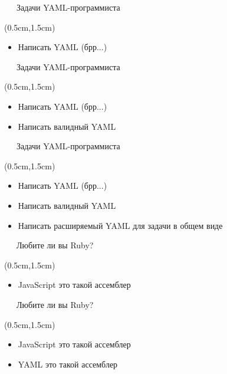\documentclass[xetex,18pt,aspectratio=43]{beamer}
\begin{document}
\begin{Large}
\begin{frame}{\ \ \ Задачи YAML-программиста}
\begin{textblock*}{\framewidth-0.8cm}(0.5cm,1.5cm)
\begin{itemize}
  \item Написать YAML (брр...)
\end{itemize}
\end{textblock*}
\end{frame}

\begin{frame}{\ \ \ Задачи YAML-программиста}
\begin{textblock*}{\framewidth-0.8cm}(0.5cm,1.5cm)
\begin{itemize}
  \item Написать YAML (брр...)
  \item Написать валидный YAML
\end{itemize}
\end{textblock*}
\end{frame}

\begin{frame}{\ \ \ Задачи YAML-программиста}
\begin{textblock*}{\framewidth-0.8cm}(0.5cm,1.5cm)
\begin{itemize}
  \item Написать YAML (брр...)
  \item Написать валидный YAML
  \item Написать расширяемый YAML для задачи в общем виде
\end{itemize}
\end{textblock*}
\end{frame}

\begin{frame}{\ \ \ Любите ли вы Ruby?}
\begin{textblock*}{\framewidth-0.8cm}(0.5cm,1.5cm)
\begin{itemize}
  \item JavaScript это такой ассемблер
\end{itemize}
\end{textblock*}
\end{frame}

\begin{frame}{\ \ \ Любите ли вы Ruby?}
\begin{textblock*}{\framewidth-0.8cm}(0.5cm,1.5cm)
\begin{itemize}
  \item JavaScript это такой ассемблер
  \item YAML это такой ассемблер
\end{itemize}
\end{textblock*}
\end{frame}


\end{Large}
\end{document}
